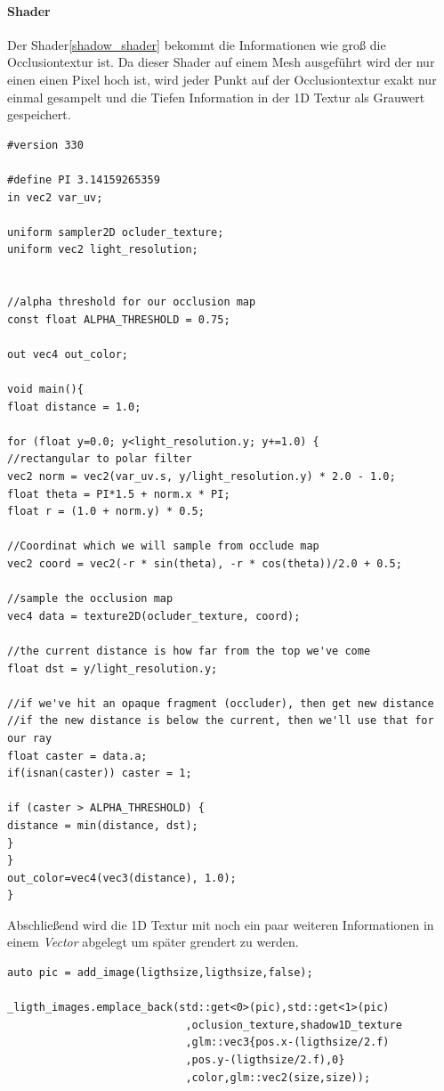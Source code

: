 \paragraph{Shader}
Der Shader\ref{shadow_shader} bekommt die Informationen wie groß die Occlusiontextur ist.
Da dieser Shader auf einem Mesh ausgeführt wird der nur einen einen Pixel hoch ist, wird jeder Punkt auf der Occlusiontextur exakt nur einmal gesampelt und die Tiefen Information in der 1D Textur als Grauwert gespeichert.

\begin{lstlisting}[caption=Shadowmaper Shader,label=shadow_shader]
#version 330

#define PI 3.14159265359
in vec2 var_uv;

uniform sampler2D ocluder_texture;
uniform vec2 light_resolution;


//alpha threshold for our occlusion map
const float ALPHA_THRESHOLD = 0.75;

out vec4 out_color;

void main(){
float distance = 1.0;

for (float y=0.0; y<light_resolution.y; y+=1.0) {
//rectangular to polar filter
vec2 norm = vec2(var_uv.s, y/light_resolution.y) * 2.0 - 1.0;
float theta = PI*1.5 + norm.x * PI;
float r = (1.0 + norm.y) * 0.5;

//Coordinat which we will sample from occlude map
vec2 coord = vec2(-r * sin(theta), -r * cos(theta))/2.0 + 0.5;

//sample the occlusion map
vec4 data = texture2D(ocluder_texture, coord);

//the current distance is how far from the top we've come
float dst = y/light_resolution.y;

//if we've hit an opaque fragment (occluder), then get new distance
//if the new distance is below the current, then we'll use that for our ray
float caster = data.a;
if(isnan(caster)) caster = 1;

if (caster > ALPHA_THRESHOLD) {
distance = min(distance, dst);
}
}
out_color=vec4(vec3(distance), 1.0);
}
\end{lstlisting}

Abschließend wird die 1D Textur mit noch ein paar weiteren Informationen in einem \textit{Vector} abgelegt um später grendert zu werden.

\begin{lstlisting}
auto pic = add_image(ligthsize,ligthsize,false);

_ligth_images.emplace_back(std::get<0>(pic),std::get<1>(pic)
							,oclusion_texture,shadow1D_texture
							,glm::vec3{pos.x-(ligthsize/2.f)
							,pos.y-(ligthsize/2.f),0}
							,color,glm::vec2(size,size));
\end{lstlisting}

